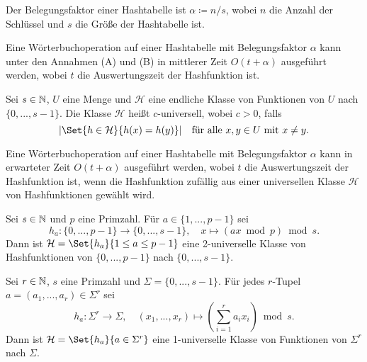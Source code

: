 \documentclass{cheat-sheet}
\begin{document}
\begin{defn}
  Der Belegungsfaktor einer Hashtabelle ist $\alpha \coloneqq n / s$, wobei $n$ die Anzahl der Schlüssel und $s$ die Größe der Hashtabelle ist.
\end{defn}

\begin{satz}
  Eine Wörterbuchoperation auf einer Hashtabelle mit Belegungsfaktor $\alpha$ kann unter den Annahmen (A) und (B) in mittlerer Zeit $O(t + \alpha)$ ausgeführt werden, wobei $t$ die Auswertungszeit der Hashfunktion ist.
\end{satz}



\begin{defn}
  Sei $s \in \mathbb{N}$, $U$ eine Menge und $\mathcal{H}$ eine endliche Klasse von Funktionen von $U$ nach $\{ 0, ..., s-1 \}$. Die Klasse $\mathcal{H}$ heißt $c$-universell, wobei $c > 0$, falls
  \[
    \abs{\Set{h \in \mathcal{H}}{ h(x) = h(y) }} \quad \text{für alle $x, y \in U$ mit $x \not= y$.}
  \]
\end{defn}

\begin{satz}
  Eine Wörterbuchoperation auf einer Hashtabelle mit Belegungsfaktor $\alpha$ kann in erwarteter Zeit $O(t + \alpha)$ ausgeführt werden, wobei $t$ die Auswertungszeit der Hashfunktion ist, wenn die Hashfunktion zufällig aus einer universellen Klasse $\mathcal{H}$ von Hashfunktionen gewählt wird.
\end{satz}

\begin{lem}
  Sei $s \in \mathbb{N}$ und $p$ eine Primzahl. Für $a \in \{ 1, ..., p-1 \}$ sei
  \[
    h_a : \{ 0, ..., p{-}1 \} \to \{ 0, ..., s{-}1 \}, \quad
    x \mapsto (ax \bmod p) \bmod s.
  \]
  Dann ist $\mathcal{H} = \Set{h_a}{1 \leq a \leq p-1}$ eine 2-universelle Klasse von Hashfunktionen von $\{ 0, ..., p{-}1 \}$ nach $\{ 0, ..., s{-}1 \}$.
\end{lem}

\begin{lem}
  Sei $r \in \mathbb{N}$, $s$ eine Primzahl und $\Sigma = \{ 0, ..., s{-}1 \}$. Für jedes $r$-Tupel $a = (a_1, ..., a_r) \in \Sigma^r$ sei
  \[
    h_a : \Sigma^r \to \Sigma, \quad
    (x_1, ..., x_r) \mapsto \left( \sum_{i=1}^r a_i x_i \right) \bmod s.
  \]
  Dann ist $\mathcal{H} = \Set{h_a}{a \in \Sigma^r}$ eine 1-universelle Klasse von Funktionen von $\Sigma^r$ nach $\Sigma$.
\end{lem}
\end{document}
